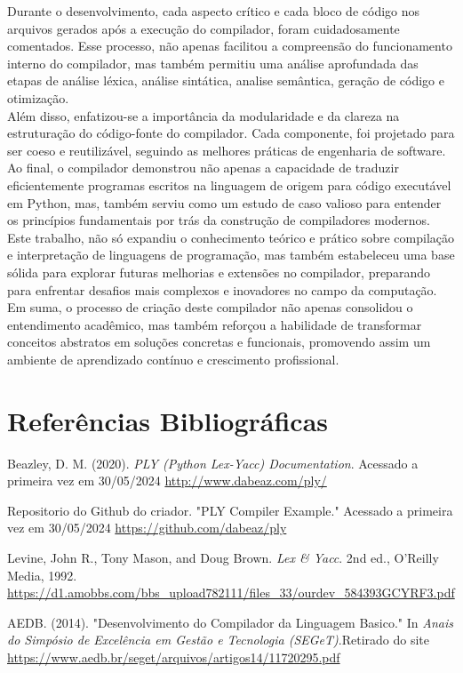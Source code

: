 \documentclass[a4paper,12pt]{article}
\begin{document}
Durante o desenvolvimento, cada aspecto crítico e cada bloco de código nos arquivos gerados após a execução do compilador, foram cuidadosamente comentados. Esse processo, não apenas facilitou a compreensão do funcionamento interno do compilador, mas também permitiu uma análise aprofundada das etapas de análise léxica, análise sintática, analise semântica, geração de código e otimização.\\

Além disso, enfatizou-se a importância da modularidade e da clareza na estruturação do código-fonte do compilador. Cada componente, foi projetado para ser coeso e reutilizável, seguindo as melhores práticas de engenharia de software.\\

Ao final, o compilador demonstrou não apenas a capacidade de traduzir eficientemente programas escritos na linguagem de origem para código executável em Python, mas, também serviu como um estudo de caso valioso para entender os princípios fundamentais por trás da construção de compiladores modernos.\\

Este trabalho, não só expandiu o conhecimento teórico e prático sobre compilação e interpretação de linguagens de programação, mas também estabeleceu uma base sólida para explorar futuras melhorias e extensões no compilador, preparando para enfrentar desafios mais complexos e inovadores no campo da computação.\\

Em suma, o processo de criação deste compilador não apenas consolidou o entendimento acadêmico, mas também reforçou a habilidade de transformar conceitos abstratos em soluções concretas e funcionais, promovendo assim um ambiente de aprendizado contínuo e crescimento profissional.



\section{Referências Bibliográficas}

\begin{thebibliography}{10}

Beazley, D. M. (2020). \textit{PLY (Python Lex-Yacc) Documentation}. Acessado a primeira vez em 30/05/2024  \url{http://www.dabeaz.com/ply/}

Repositorio do Github do criador. "PLY Compiler Example." Acessado a primeira vez em 30/05/2024 \url{https://github.com/dabeaz/ply} 

Levine, John R., Tony Mason, and Doug Brown.
\textit{Lex \& Yacc}.
2nd ed., O'Reilly Media, 1992.
\url{https://d1.amobbs.com/bbs_upload782111/files_33/ourdev_584393GCYRF3.pdf}

AEDB. (2014). "Desenvolvimento do Compilador da Linguagem Basico." In \textit{Anais do Simpósio de Excelência em Gestão e Tecnologia (SEGeT)}.Retirado do site \url{https://www.aedb.br/seget/arquivos/artigos14/11720295.pdf}

\end{thebibliography}
\end{document}
